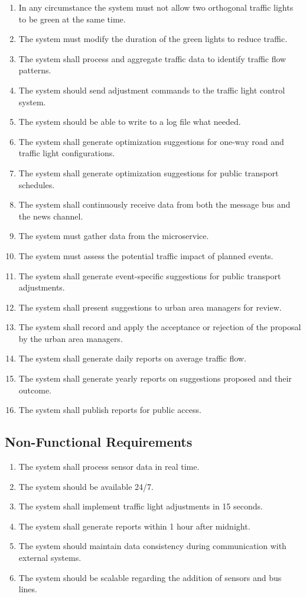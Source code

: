 \documentclass[12pt, a4paper, twoside, openright]{report}
\begin{document}
\begin{enumerate}
\item
  In any circumstance the system must not allow two orthogonal traffic
  lights to be green at the same time.
\item
  The system must modify the duration of the green lights to reduce
  traffic.
\item
  The system shall process and aggregate traffic data to identify
  traffic flow patterns.
\item
  The system should send adjustment commands to the traffic light
  control system.
\item
  The system should be able to write to a log file what needed.
\item
  The system shall generate optimization suggestions for one-way road
  and traffic light configurations.
\item
  The system shall generate optimization suggestions for public
  transport schedules.
\item
  The system shall continuously receive data from both the message bus
  and the news channel.
\item
  The system must gather data from the microservice.
\item
  The system must assess the potential traffic impact of planned events.
\item
  The system shall generate event-specific suggestions for public
  transport adjustments.
\item
  The system shall present suggestions to urban area managers for
  review.
\item
  The system shall record and apply the acceptance or rejection of the
  proposal by the urban area managers.
\item
  The system shall generate daily reports on average traffic flow.
\item
  The system shall generate yearly reports on suggestions proposed and
  their outcome.
\item
  The system shall publish reports for public access.
\end{enumerate}

\subsection{Non-Functional Requirements}

\begin{enumerate}
\item
  The system shall process sensor data in real time.
\item
  The system should be available 24/7.
\item
  The system shall implement traffic light adjustments in 15 seconds.
\item
  The system shall generate reports within 1 hour after midnight.
\item
  The system should maintain data consistency during communication with
  external systems.
\item
  The system should be scalable regarding the addition of sensors and
  bus lines.
\end{enumerate}
\end{document}
